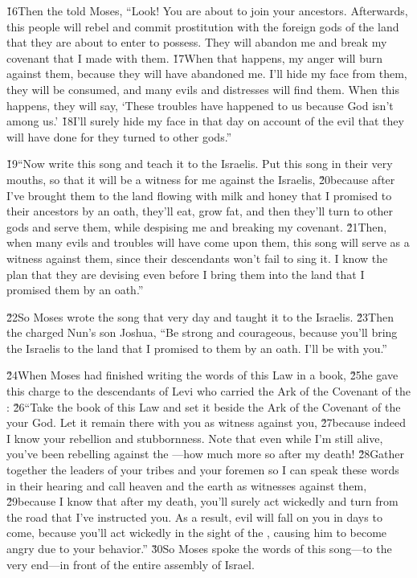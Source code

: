 \v{16}Then the  told Moses, ``Look! You are about to join your ancestors. Afterwards, this people will rebel and commit prostitution with the foreign gods of the land that they are about to enter to possess. They will abandon me and break my covenant that I made with them. \v{17}When that happens, my anger will burn against them, because they will have abandoned me. I'll hide my face from them, they will be consumed, and many evils and distresses will find them. When this happens, they will say, `These troubles have happened to us because God isn't among us.' \v{18}I'll surely hide my face in that day on account of the evil that they will have done for they turned to other gods.''

\v{19}``Now write this song and teach it to the Israelis. Put this song in their very mouths, so that it will be a witness for me against the Israelis, \v{20}because after I've brought them to the land flowing with milk and honey that I promised to their ancestors by an oath, they'll eat, grow fat, and then they'll turn to other gods and serve them, while despising me and breaking my covenant. \v{21}Then, when many evils and troubles will have come upon them, this song will serve as a witness against them, since their descendants won't fail to sing it. I know the plan that they are devising even before I bring them into the land that I promised them by an oath.''

\v{22}So Moses wrote the song that very day and taught it to the Israelis. \v{23}Then the  charged Nun's son Joshua, ``Be strong and courageous, because you'll bring the Israelis to the land that I promised to them by an oath. I'll be with you.''

\v{24}When Moses had finished writing the words of this Law in a book, \v{25}he gave this charge to the descendants of Levi who carried the Ark of the Covenant of the : \v{26}``Take the book of this Law and set it beside the Ark of the Covenant of the  your God. Let it remain there with you as witness against you, \v{27}because indeed I know your rebellion and stubbornness. Note that even while I'm still alive, you've been rebelling against the ---how much more so after my death! \v{28}Gather together the leaders of your tribes and your foremen so I can speak these words in their hearing and call heaven and the earth as witnesses against them, \v{29}because I know that after my death, you'll surely act wickedly and turn from the road that I've instructed you. As a result, evil will fall on you in days to come, because you'll act wickedly in the sight of the , causing him to become angry due to your behavior.'' \v{30}So Moses spoke the words of this song---to the very end---in front of the entire assembly of Israel.

